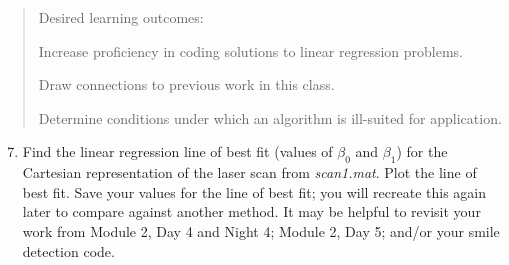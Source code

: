 \documentclass[M3_Night5_Solutions]{subfiles}
\begin{document}
\begin{enumerate}[resume=exercises, label=\textbf{Exercise} (\arabic*)]
\begin{quote}Desired learning outcomes:
\bi
\item Increase proficiency in coding solutions to linear regression problems.
\item Draw connections to previous work in this class.
\item Determine conditions under which an algorithm is ill-suited for application.
\ei
\end{quote}
\begin{enumerate}[resume=exercises, label=\textbf{Exercise} (\arabic*)]
\setcounter{enumi}{6}
\item Find the linear regression line of best fit (values of $\beta_0$ and $\beta_1$) for the Cartesian representation of the laser scan from \emph{scan1.mat}.  Plot the line of best fit.  Save your values for the line of best fit; you will recreate this again later to compare against another method. It may be helpful to revisit your work from Module 2, Day 4 and Night 4;  Module 2, Day 5; and/or your smile detection code.



\end{enumerate}
\end{enumerate}
\end{document}
